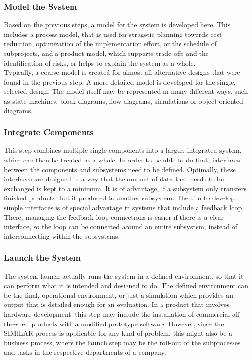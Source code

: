 \subsubsection{Model the System}

Based on the previous steps, a model for the system is developed here.
This includes a process model, that is used for stragetic planning towards cost reduction, optimization of the implementation effort, or the schedule of subprojects, and a product model, which supports trade-offs and the identification of risks, or helps to explain the system as a whole.\\

Typically, a coarse model is created for almost all alternative designs that were found in the previous step.
A more detailed model is developed for the single, selected design.
The model itself may be represented in many different ways, such as state machines, block diagrams, flow diagrams, simulations or object-oriented diagrams.

\subsubsection{Integrate Components}

This step combines multiple single components into a larger, integrated system, which can then be treated as a whole.
In order to be able to do that, interfaces between the components and subsystems need to be defined.
Optimally, these interfaces are designed in a way that the amount of data that needs to be exchanged is kept to a minimum.
It is of advantage, if a subsystem only transfers finished products that it produced to another subsystem.
The aim to develop simple interfaces is of special advantage in systems that include a feedback loop.
There, managing the feedback loop connections is easier if there is a clear interface, so the loop can be connected around an entire subsystem, instead of interconnecting within the subsystems.

\subsubsection{Launch the System}

The system launch actually runs the system in a defined environment, so that it can perform what it is intended and designed to do.
The defined environment can be the final, operational environment, or just a simulation which provides an output that is detailed enough for an evaluation.
In a product that involves hardware development, this step may include the installation of commercial-off-the-shelf products with a modified prototype software.
However, since the SIMILAR process is applicable for any kind of problem, this might also be a business process, where the launch step may be the roll-out of the subprocesses and tasks in the respective departments of a company.

